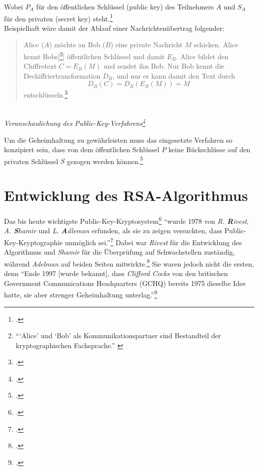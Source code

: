 \documentclass{scrarticle}
\begin{document}
        Wobei $P_A$ für den öffentlichen Schlüssel (public key) des Teilnehmers $A$ und $S_A$ für den privaten (secret key) steht.\footcite[vgl.][21f.]{ertel2003}\\
        Beispielhaft wäre damit der Ablauf einer Nachrichtenübertrag folgender:
        \begin{quote}
            Alice ($A$) möchte an Bob ($B$) eine private Nachricht $M$ schicken. Alice kennt Bobs[\footnote{\enquote{\enquote*{Alice} und \enquote*{Bob} als Kommunikationspartner sind Bestandteil der kryptographischen Fachsprache.} \cite[21]{ertel2003}}] öffentlichen Schlüssel und damit $E_B$. Alice bildet den Chiffretext $C = E_B(M)$ und sendet ihn Bob. Nur Bob kennt die Dechiffriertransformation $D_B$, und nur er kann damit den Text durch
            \begin{equation*}
                D_B(C) = D_B(E_B(M)) = M
            \end{equation*}
            entschlüsseln.\footcite[68]{watjen2008}
        \end{quote}
        \begin{center}
            \\
            \emph{Veranschaulichung des Public-Key-Verfahrens\footcite[67]{watjen2008}}\\            
        \end{center}
        Um die Geheimhaltung zu gewährleisten muss das eingesetzte Verfahren so konzipiert sein, dass von dem öffentlichen Schlüssel $P$ keine Rückschlüsse auf den privaten Schlüssel $S$ gezogen werden können.\footcite[33]{beutelspacher2015} %
    
    \section{Entwicklung des RSA-Algorithmus}
        Das bis heute wichtigste Public-Key-Kryptosystem\footcite[vgl.][26]{pieprzyk2010topics} \enquote{wurde 1978 von \emph{R. \textbf{R}ivest},\\ \emph{A. \textbf{S}hamir} und \emph{L. \textbf{A}dleman} erfunden, als sie zu zeigen versuchten, dass Public-Key-Kryptographie unmöglich sei.}\footcite[43]{beutelspacher2015} Dabei war \emph{Rivest} für die Entwicklung des Algorithmus und \emph{Shamir} für die Überprüfung auf Schwachstellen zuständig, während \emph{Adelman} auf beiden Seiten mitwirkte.\footcite[77]{ertel2003} Sie waren jedoch nicht die ersten, denn \enquote{Ende 1997 [wurde bekannt], dass \emph{Clifford Cocks} von den britischen Government Communications Headquarters (GCHQ) bereits 1975 dieselbe Idee hatte, sie aber strenger Geheimhaltung unterlag.}\footcite[71]{watjen2008}%
    
\end{document}
